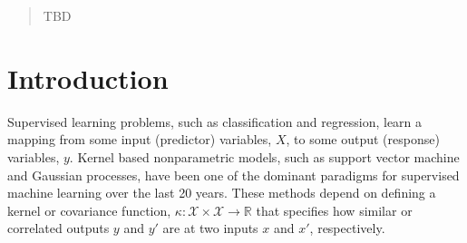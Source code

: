 \documentclass[twoside]{article}
\begin{document}
\def\ie{i.e.\ }
\def\eg{e.g.\ }
\def\iid{i.i.d.\ }
\def\simiid{\sim_{\mbox{\tiny iid}}}
\def\eqdist{\stackrel{\mbox{\tiny d}}{=}}

\def\Reals{\mathbb{R}}

\def\Uniform{\mbox{\rm Uniform}}
\def\Bernoulli{\mbox{\rm Bernoulli}}
\def\GP{\mathcal{GP}}

\def\inputVar{x}
\def\InputVar{X}
\def\InputSpace{\mathcal{X}}
\def\outputVar{y}
\def\kernel{\kappa}
\def\KernelMatrix{K}


\begin{abstract}
TBD
\end{abstract}

\section{Introduction}

Supervised learning problems, such as classification and regression, learn a mapping from some input (predictor) variables, $\InputVar$, to some output (response) variables, $\outputVar$.
Kernel based nonparametric models, such as support vector machine and Gaussian processes, have been one of the dominant paradigms for supervised machine learning over the last 20 years.
These methods depend on defining a kernel or covariance function, $\kernel : \InputSpace \times \InputSpace \to \Reals$ that specifies how similar or correlated outputs $\outputVar$ and $\outputVar'$ are at two inputs $\inputVar$ and $\inputVar'$, respectively.
\end{document}
